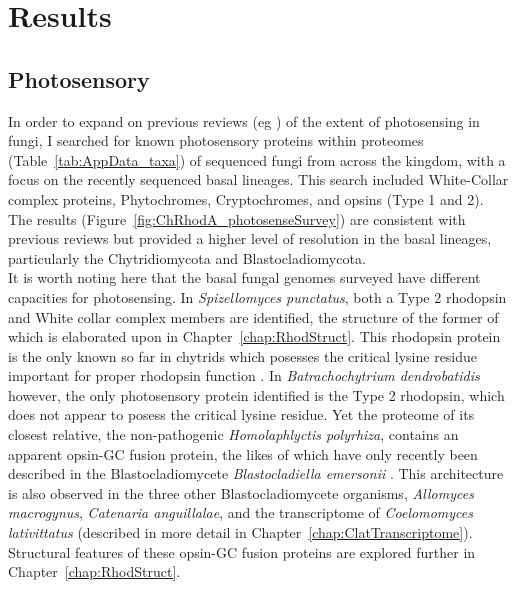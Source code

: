 \section{Results}
\subsection*{Photosensory}
In order to expand on previous reviews (eg \cite{Idnurm2010}) of the extent of photosensing in fungi, I searched for known photosensory proteins within proteomes (Table~\ref{tab:AppData_taxa}) of sequenced fungi from across the kingdom, with a focus on the recently sequenced basal lineages. This search included White-Collar complex proteins, Phytochromes, Cryptochromes, and opsins (Type 1 and 2). The results (Figure~\ref{fig:ChRhodA_photosenseSurvey}) are consistent with previous reviews but provided a higher level of resolution in the basal lineages, particularly the Chytridiomycota and Blastocladiomycota.\\
\indent It is worth noting here that the basal fungal genomes surveyed have different capacities for photosensing. In \textit{Spizellomyces punctatus}, both a Type 2 rhodopsin and White collar complex members are identified, the structure of the former of which is elaborated upon in Chapter~\ref{chap:RhodStruct}. This rhodopsin protein is the only known so far in chytrids which posesses the critical lysine residue important for proper rhodopsin function \cite{Smith2010}. In \textit{Batrachochytrium dendrobatidis} however, the only photosensory protein identified is the Type 2 rhodopsin, which does not appear to posess the critical lysine residue. Yet the proteome of its closest relative, the non-pathogenic \textit{Homolaphlyctis polyrhiza}, contains an apparent opsin-GC fusion protein, the likes of which have only recently been described in the Blastocladiomycete \textit{Blastocladiella emersonii} \cite{Avelar2014}. This architecture is also observed in the three other Blastocladiomycete organisms, \textit{Allomyces macrogynus}, \textit{Catenaria anguillalae}, and the transcriptome of \textit{Coelomomyces lativittatus} (described in more detail in Chapter~\ref{chap:ClatTranscriptome}). Structural features of these opsin-GC fusion proteins are explored further in Chapter~\ref{chap:RhodStruct}.\\

